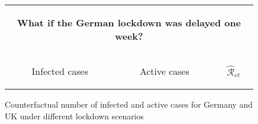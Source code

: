 \documentclass[12pt]{article}
\begin{document}
\begin{figure}[p]%
\caption
{Counterfactual number of infected and active cases for Germany and UK under different lockdown scenarios}%
\vspace{-0.2cm}%
\label{fig: Germany_UK_1w}

\begin{center}%
\hspace*{-0.6cm}%
\begin{tabular}
[c]{ccc}%
\multicolumn{3}{c}{%
\begin{footnotesize}%
\textbf{What if the German lockdown was delayed one week?}%
\end{footnotesize}%
\vspace{0.2cm}%
}\\%
\hspace*{-0.2cm}%
{\footnotesize Infected cases} & {\footnotesize Active cases} &
\hspace*{-0.8cm}%
\begin{footnotesize}%
$\mathcal{\hat{R}}_{et}$%
\end{footnotesize}%
\\%

\end{tabular}
\end{center}
\end{figure}
\end{document}
